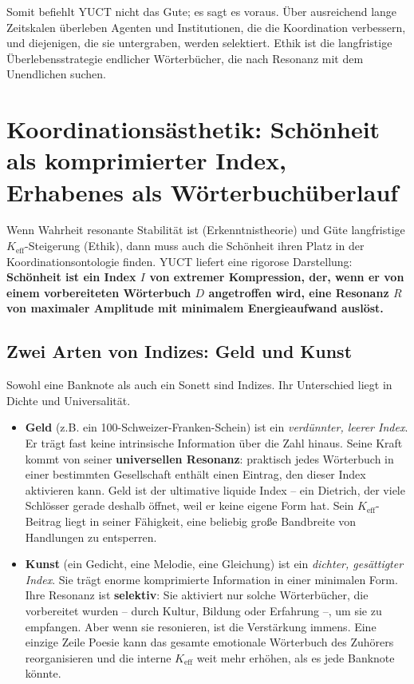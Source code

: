 \documentclass[12pt,a4paper]{article}
\begin{document}
Somit befiehlt YUCT nicht das Gute; es sagt es voraus. Über ausreichend lange Zeitskalen überleben Agenten und Institutionen, die die Koordination verbessern, und diejenigen, die sie untergraben, werden selektiert. Ethik ist die langfristige Überlebensstrategie endlicher Wörterbücher, die nach Resonanz mit dem Unendlichen suchen.

\section{Koordinationsästhetik: Schönheit als komprimierter Index, Erhabenes als Wörterbuchüberlauf}
\label{sec:coordination-aesthetics}

Wenn Wahrheit resonante Stabilität ist (Erkenntnistheorie) und Güte langfristige \(K_{\mathrm{eff}}\)-Steigerung (Ethik), dann muss auch die Schönheit ihren Platz in der Koordinationsontologie finden. YUCT liefert eine rigorose Darstellung: \textbf{Schönheit ist ein Index \(I\) von extremer Kompression, der, wenn er von einem vorbereiteten Wörterbuch \(D\) angetroffen wird, eine Resonanz \(R\) von maximaler Amplitude mit minimalem Energieaufwand auslöst.}

\subsection{Zwei Arten von Indizes: Geld und Kunst}

Sowohl eine Banknote als auch ein Sonett sind Indizes. Ihr Unterschied liegt in Dichte und Universalität.

\begin{itemize}[leftmargin=*]
	\item \textbf{Geld} (z.B. ein 100-Schweizer-Franken-Schein) ist ein \emph{verdünnter, leerer Index}. Er trägt fast keine intrinsische Information über die Zahl hinaus. Seine Kraft kommt von seiner \textbf{universellen Resonanz}: praktisch jedes Wörterbuch in einer bestimmten Gesellschaft enthält einen Eintrag, den dieser Index aktivieren kann. Geld ist der ultimative liquide Index – ein Dietrich, der viele Schlösser gerade deshalb öffnet, weil er keine eigene Form hat. Sein \(K_{\mathrm{eff}}\)-Beitrag liegt in seiner Fähigkeit, eine beliebig große Bandbreite von Handlungen zu entsperren.
	\item \textbf{Kunst} (ein Gedicht, eine Melodie, eine Gleichung) ist ein \emph{dichter, gesättigter Index}. Sie trägt enorme komprimierte Information in einer minimalen Form. Ihre Resonanz ist \textbf{selektiv}: Sie aktiviert nur solche Wörterbücher, die vorbereitet wurden – durch Kultur, Bildung oder Erfahrung –, um sie zu empfangen. Aber wenn sie resonieren, ist die Verstärkung immens. Eine einzige Zeile Poesie kann das gesamte emotionale Wörterbuch des Zuhörers reorganisieren und die interne \(K_{\mathrm{eff}}\) weit mehr erhöhen, als es jede Banknote könnte.
\end{itemize}
\end{document}
